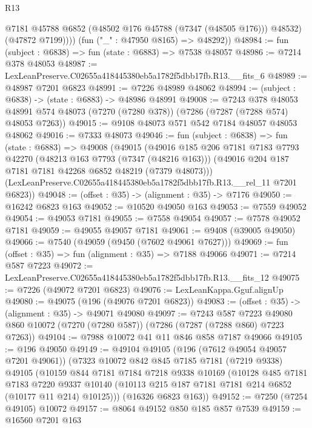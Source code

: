 \begin{lexlean}{R13}
\begin{coremodule}
              @7181
              @45788
              @6852
              (@48502 @176 @45788 (@7347 (@48505 @176)))
              @48532)
            (@47872 @7199))))
      (fun ("_" : @47950 @8165) => @48292))
@48984 := fun (subject : @6838) => fun (state : @6883) => @7538 @48057
@48986 := @7214 @378 @48053
@48987 := LexLeanPreserve.C02655a418445380eb5a1782f5dbb17fb.R13.__fits_6
@48989 := @48987 @7201 @6823
@48991 := @7226 @48989 @48062
@48994 := (subject : @6838) -> (state : @6883) -> @48986 @48991
@49008 := @7243
    @378
    @48053
    @48991
    @574
    @48073
    (@7270 (@7280 @378))
    (@7286 (@7287 (@7288 @574) @48053 @7263))
@49015 := @9108 @48073 @571 @542 @7184 @48057 @48053 @48062
@49016 := @7333 @48073
@49046 := fun (subject : @6838) =>
  fun (state : @6883) =>
  @49008
    (@49015
      (@49016
        @185
        @206
        @7181
        @7183
        @7793
        @42270
        (@48213 @163 @7793 (@7347 (@48216 @163)))
        (@49016 @204 @187 @7181 @7181 @42268 @6852 @48219 (@7379 @48073)))
      (LexLeanPreserve.C02655a418445380eb5a1782f5dbb17fb.R13.__rel_11 @7201 @6823))
@49048 := (offset : @35) -> (alignment : @35) -> @7176
@49050 := @16242 @6823 @163
@49052 := @10520 @49050 @163
@49053 := @7559 @49052
@49054 := @49053 @7181
@49055 := @7558 @49054
@49057 := @7578 @49052 @7181
@49059 := @49055 @49057 @7181
@49061 := @9408 (@39005 @49050)
@49066 := @7540 (@49059 (@9450 (@7602 @49061 @7627)))
@49069 := fun (offset : @35) => fun (alignment : @35) => @7188 @49066
@49071 := @7214 @587 @7223
@49072 := LexLeanPreserve.C02655a418445380eb5a1782f5dbb17fb.R13.__fits_12
@49075 := @7226 (@49072 @7201 @6823)
@49076 := LexLeanKappa.Gguf.alignUp
@49080 := @49075 (@196 (@49076 @7201 @6823))
@49083 := (offset : @35) -> (alignment : @35) -> @49071 @49080
@49097 := @7243
    @587
    @7223
    @49080
    @860
    @10072
    (@7270 (@7280 @587))
    (@7286 (@7287 (@7288 @860) @7223 @7263))
@49104 := @7988 @10072 @41 @11 @846 @858 @7187 @49066
@49105 := @196 @49050
@49149 := @49104
    @49105
    (@196 (@7612 @49054 @49057 @7201 @49061))
    (@7323
      @10072
      @842
      @845
      @7185
      @7181
      (@7219 @9338)
      @49105
      (@10159
        @844
        @7181
        @7184
        @7218
        @9338
        @10169
        (@10128
          @485
          @7181
          @7183
          @7220
          @9337
          @10140
          (@10113 @215 @187 @7181 @7181 @214 @6852 (@10177 @11 @214) @10125)))
      (@16326 @6823 @163))
@49152 := @7250 (@7254 @49105) @10072
@49157 := @8064 @49152 @850 @185 @857 @7539
@49159 := @16560 @7201 @163

\end{coremodule}
\end{lexlean}

